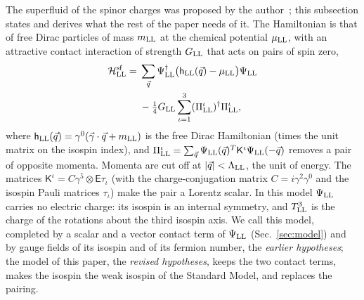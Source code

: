 \documentclass[aps,prd,twocolumn,superscriptaddress,nofootinbib,floatfix,longbibliography]{revtex4-2}
\newcommand{\LL}{{\rm LL}}
\begin{document}
The superfluid of the spinor charges was proposed by the author~\cite{Nash2026}; this subsection states and derives what
the rest of the paper needs of it. The Hamiltonian is that of free Dirac particles of mass $m_\LL$ at the chemical
potential $\mu_\LL$, with an attractive contact interaction of strength $G_\LL$ that acts on pairs of spin zero,
\begin{equation}
\begin{split}
\mathcal H^{\rm sf}_\LL={}&\sum_{\vec q}\Psi_\LL^\dagger\big(\mathsf h_\LL(\vec q)-\mu_\LL\big)\Psi_\LL\\
&-\tfrac14G_\LL\sum_{\iota=1}^3(\Pi^\iota_\LL)^\dagger\Pi^\iota_\LL ,
\end{split}
\label{eq:hsf}
\end{equation}
where $\mathsf h_\LL(\vec q)=\gamma^0(\vec\gamma\cdot\vec q+m_\LL)$ is the free Dirac Hamiltonian (times the unit
matrix on the isospin index), and $\Pi^\iota_\LL=\sum_{\vec q}\Psi_\LL(\vec q)^T\mathsf K^\iota\Psi_\LL(-\vec q)$ removes a
pair of opposite momenta. Momenta are cut off at $|\vec q|<\Lambda_\LL$, the unit of energy. The matrices $\mathsf
K^\iota=C\gamma^5\otimes\mathsf E\tau_\iota$ (with the charge-conjugation matrix $C=i\gamma^2\gamma^0$ and the isospin
Pauli matrices $\tau_\iota$) make the pair a Lorentz scalar. In this model $\Psi_\LL$ carries no electric charge: its
isospin is an internal symmetry, and $T^3_\LL$ is the charge of the rotations about the third isospin axis. We call this
model, completed by a scalar and a vector contact term of $\Psi_\LL$ (Sec.~\ref{sec:model}) and by gauge fields of its
isospin and of its fermion number, the \emph{earlier hypotheses}; the model of this paper, the \emph{revised hypotheses},
keeps the two contact terms, makes the isospin the weak isospin of the Standard Model, and replaces the pairing.
\end{document}
